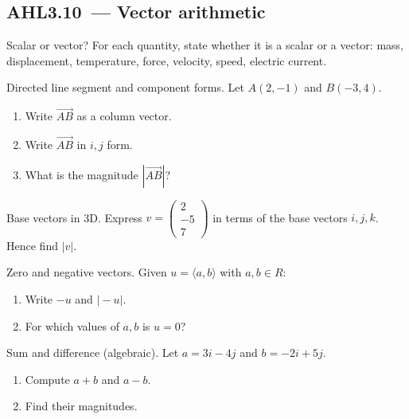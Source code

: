 \documentclass[11pt]{article}
\def\textbf#1{#1}%
\def\mathbb#1{#1}%
\def\mathbf#1{#1}%
\newcommand{\tocsubsection}[1]{\subsection{#1}}
\newcounter{question}
\begin{document}
\tocsubsection{AHL3.10 — Vector arithmetic}


\begin{question}
\textbf{Scalar or vector?}
For each quantity, state whether it is a scalar or a vector: mass, displacement, temperature, force, velocity, speed, electric current.
\end{question}

\begin{question}
\textbf{Directed line segment and component forms.}
Let $A(2,-1)$ and $B(-3,4)$.
\begin{enumerate}
  \item Write $\overrightarrow{AB}$ as a column vector.
  \item Write $\overrightarrow{AB}$ in $\mathbf{i},\mathbf{j}$ form.
  \item What is the magnitude $|\overrightarrow{AB}|$?
\end{enumerate}
\end{question}

\begin{question}
\textbf{Base vectors in 3D.}
Express $\mathbf{v}=\begin{pmatrix}2\\-5\\7\end{pmatrix}$ in terms of the base vectors $\mathbf{i},\mathbf{j},\mathbf{k}$. Hence find $|\mathbf{v}|$.
\end{question}

\begin{question}
\textbf{Zero and negative vectors.}
Given $\mathbf{u}=\langle a,b\rangle$ with $a,b\in\mathbb{R}$:
\begin{enumerate}
  \item Write $-\mathbf{u}$ and $|\!-\!\mathbf{u}|$.
  \item For which values of $a,b$ is $\mathbf{u}=\mathbf{0}$?
\end{enumerate}
\end{question}

\begin{question}
\textbf{Sum and difference (algebraic).}
Let $\mathbf{a}=3\mathbf{i}-4\mathbf{j}$ and $\mathbf{b}=-2\mathbf{i}+5\mathbf{j}$.
\begin{enumerate}
  \item Compute $\mathbf{a}+\mathbf{b}$ and $\mathbf{a}-\mathbf{b}$.
  \item Find their magnitudes.
\end{enumerate}
\end{question}
\end{document}
